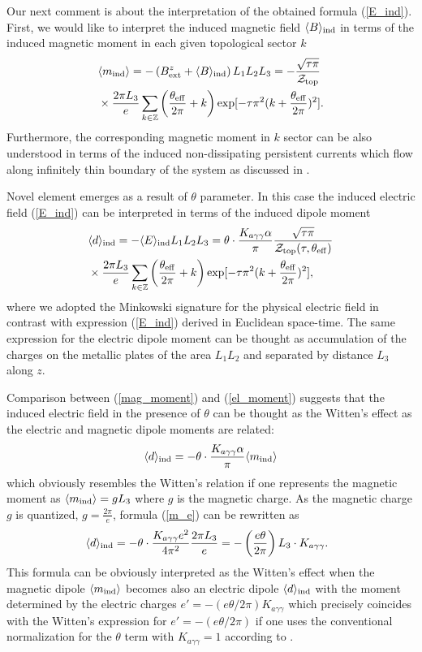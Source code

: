 \documentclass[ twocolumn,aps,prd,   
               preprintnumbers,numbers,sort&compress,nofootinbib,
                            showpacs,superscriptaddress,
               colorlinks,
               linkcolor=blue,   
               citecolor=blue]{revtex4-1}   \newcommand{\exclude}[1]{}
\newcommand{\be}{\begin{eqnarray}}
\newcommand{\ee}{\end{eqnarray}}
\def\la{\langle}
\def\ra{\rangle}
\begin{document}
 Our next comment is about the interpretation of the obtained formula (\ref{E_ind}).  First, we would like to interpret the induced magnetic field $ \la {B}\ra_{\rm ind}$ in terms of the induced magnetic moment in each given topological sector $k$ 
 \begin{align}
  \label{mag_moment}
  & \la m_{\rm ind}\ra=-\left(B^z_{\rm ext} +\la B\ra_{\rm ind}\right) L_1 L_2 L_3 =- \frac{\sqrt{\tau \pi}}{{\cal Z}_{\rm top}} \\
  &\times \frac{2\pi L_3}{e} \sum_{k \in \mathbb{Z}} \left(\frac{\theta_{\rm eff}}{2\pi}+k\right) \exp[-\tau \pi^2(k+\frac{\theta_{\rm eff}}{2\pi})^2]. \nonumber
  \end{align}
 Furthermore,  the corresponding magnetic moment in  $k$ sector can be also understood in terms of the induced non-dissipating persistent currents which flow along infinitely thin boundary of the system  as  discussed in \cite{Zhitnitsky:2015fpa}. 

Novel element emerges as a result of   $\theta$ parameter. In this case the induced electric field (\ref{E_ind}) can be interpreted in terms of the induced dipole moment
 \begin{align}
  \label{el_moment}
  & \la d\ra_{\rm ind}=-\la E\ra_{\rm ind} L_1 L_2 L_3 ={\theta}\cdot  \frac{K_{a\gamma\gamma} \alpha}{\pi} \frac{\sqrt{\tau \pi}}{{\cal Z}_{\rm top}(\tau, \theta_{\rm eff})} \\
  &\times \frac{2\pi L_3}{e} \sum_{k \in \mathbb{Z}} \left(\frac{\theta_{\rm eff}}{2\pi}+k\right) \exp[-\tau \pi^2(k+\frac{\theta_{\rm eff}}{2\pi})^2], \nonumber
  \end{align}
where we adopted the Minkowski signature for the physical electric field in contrast with expression (\ref{E_ind}) derived in Euclidean space-time. The same expression for the electric dipole moment can be thought as accumulation of the charges on the metallic plates 
of the area  $L_1L_2$ and separated by distance $L_3$ along $z$. 

Comparison between (\ref{mag_moment}) and (\ref{el_moment})
suggests that the induced electric field in the presence of $\theta$ can be thought as the Witten's effect  as the electric and magnetic dipole moments are related:
\be
\label{m_e}
 \la d\ra_{\rm ind}= -{\theta}\cdot  \frac{K_{a\gamma\gamma} \alpha}{\pi}  \la m_{\rm ind}\ra
\ee
which    obviously resembles the Witten's  relation if one represents the magnetic moment as $ \la m_{\rm ind}\ra =g L_3$ where $g$ is the magnetic charge.  As the magnetic charge $g$ is quantized, $g=\frac{2\pi}{e}$,  formula (\ref{m_e}) can be rewritten as
 \be
\label{m_e_witten}
 \la d\ra_{\rm ind}= -{\theta}\cdot  \frac{K_{a\gamma\gamma}e^2}{4\pi^2}  \frac{2\pi L_3}{e}=-\left(\frac{e\theta }{2\pi}\right)  L_3\cdot  K_{a\gamma\gamma}.~~
\ee
 This formula can be obviously interpreted as the Witten's effect when the magnetic dipole $\la m_{\rm ind}\ra$ becomes also an electric dipole  $\la d\ra_{\rm ind}$ with the moment
 determined by the electric charges $e'= - ({e\theta }/{2\pi}) K_{a\gamma\gamma}$ which precisely coincides with the Witten's expression for $e'= - ({e\theta }/{2\pi})$ if one uses the conventional normalization  for the $\theta$ term with $K_{a\gamma\gamma}=1$ according to  \cite{Witten:1979ey}.
 
\end{document}
